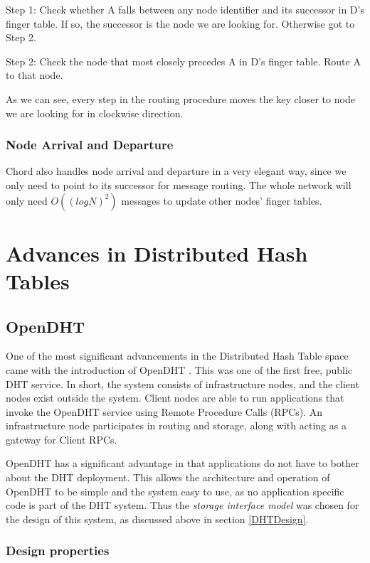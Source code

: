 \documentclass[11pt,a4paper]{article}
\begin{document}
    Step 1: Check whether A falls between any node identifier and its successor in D’s finger table. If so, the successor is the node we are looking for. Otherwise got to Step 2.
    
    Step 2: Check the node that most closely precedes A in D’s finger table. Route A to that node.
    
    As we can see, every step in the routing procedure moves the key closer to node we are looking for in clockwise direction. 
    
    \subsubsection{Node Arrival and Departure}
    
    Chord also handles node arrival and departure in a very elegant way, since we only need to point to its successor for message routing. The whole network will only need \( O((log N)^2) \) messages to update other nodes’ finger tables.
    
    \section{Advances in Distributed Hash Tables}
    
    \subsection{OpenDHT} \label{opendht}
    
    One of the most significant advancements in the Distributed Hash Table space came with the introduction of OpenDHT \cite{OpenDHTRhea}. This was one of the first free, public DHT service. In short, the system consists of infrastructure nodes, and the client nodes exist outside the system. Client nodes are able to run applications that invoke the OpenDHT service using Remote Procedure Calls (RPCs). An infrastructure node participates in routing and storage, along with acting as a gateway for Client RPCs.
    
    OpenDHT has a significant advantage in that applications do not have to bother about the DHT deployment. This allows the architecture and operation of OpenDHT to be simple and the system easy to use, as no application specific code is part of the DHT system. Thus the \textit{storage interface model} was chosen for the design of this system, as discussed above in section \ref{DHTDesign}.
    
    \subsubsection{Design properties}
    
\end{document}
